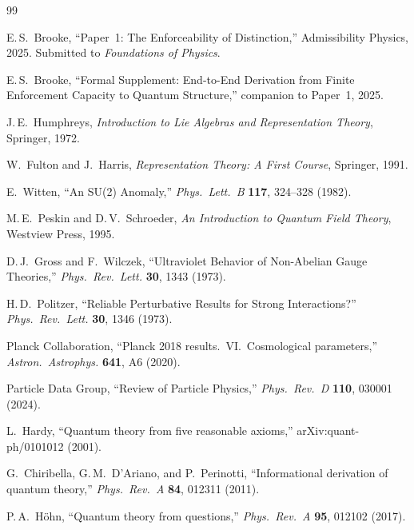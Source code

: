 \documentclass[11pt,a4paper]{article}
\theoremstyle{definition}
\begin{document}

\begin{thebibliography}{99}

E.\,S.~Brooke, ``Paper~1: The Enforceability of Distinction,''
Admissibility Physics, 2025.
Submitted to \textit{Foundations of Physics}.

E.\,S.~Brooke, ``Formal Supplement: End-to-End Derivation from Finite
Enforcement Capacity to Quantum Structure,'' companion to Paper~1, 2025.

J.\,E.~Humphreys, \textit{Introduction to Lie Algebras and Representation
Theory}, Springer, 1972.

W.~Fulton and J.~Harris, \textit{Representation Theory: A First Course},
Springer, 1991.

E.~Witten, ``An SU(2) Anomaly,'' \textit{Phys.\ Lett.\ B} \textbf{117},
324--328 (1982).

M.\,E.~Peskin and D.\,V.~Schroeder, \textit{An Introduction to Quantum
Field Theory}, Westview Press, 1995.

D.\,J.~Gross and F.~Wilczek, ``Ultraviolet Behavior of Non-Abelian
Gauge Theories,'' \textit{Phys.\ Rev.\ Lett.} \textbf{30}, 1343 (1973).

H.\,D.~Politzer, ``Reliable Perturbative Results for Strong Interactions?''
\textit{Phys.\ Rev.\ Lett.} \textbf{30}, 1346 (1973).

Planck Collaboration, ``Planck 2018 results.\ VI.\ Cosmological
parameters,'' \textit{Astron.\ Astrophys.} \textbf{641}, A6 (2020).

Particle Data Group, ``Review of Particle Physics,''
\textit{Phys.\ Rev.\ D} \textbf{110}, 030001 (2024).

L.~Hardy, ``Quantum theory from five reasonable axioms,''
arXiv:quant-ph/0101012 (2001).

G.~Chiribella, G.\,M.~D'Ariano, and P.~Perinotti,
``Informational derivation of quantum theory,''
\textit{Phys.\ Rev.\ A} \textbf{84}, 012311 (2011).

P.\,A.~H\"ohn, ``Quantum theory from questions,''
\textit{Phys.\ Rev.\ A} \textbf{95}, 012102 (2017).


\end{thebibliography}
\end{document}
